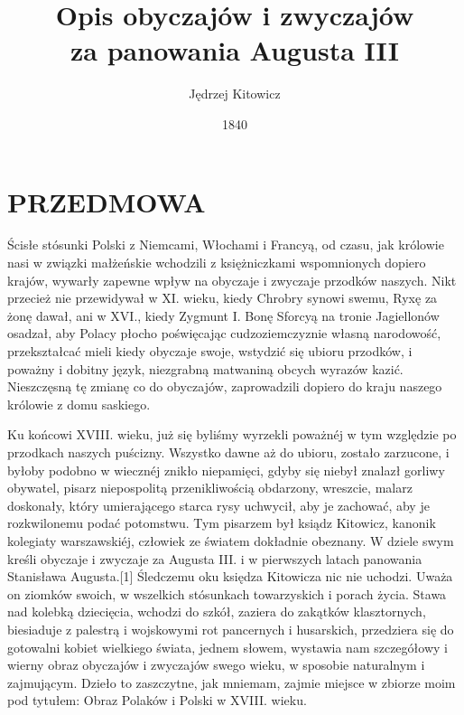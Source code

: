 \documentclass{book}
\begin{document}
\title{%
  \LARGE Opis obyczajów i zwyczajów \\
  \large za panowania Augusta III
  } 
\author{\Large Jędrzej Kitowicz}
\date{1840}

\maketitle

\pagebreak

\tableofcontents

\listoftables   

\chapter*{PRZEDMOWA}
Ścisłe stósunki Polski z Niemcami, Włochami i Francyą, od czasu, jak królowie nasi w związki małżeńskie wchodzili z księżniczkami wspomnionych dopiero krajów, wywarły zapewne wpływ na obyczaje i zwyczaje przodków naszych. Nikt przecież nie przewidywał w XI. wieku, kiedy Chrobry synowi swemu, Ryxę za żonę dawał, ani w XVI., kiedy Zygmunt I. Bonę Sforcyą na tronie Jagiellonów osadzał, aby Polacy płocho poświęcając cudzoziemczyznie własną narodowość, przekształcać mieli kiedy obyczaje swoje, wstydzić się ubioru przodków, i poważny i dobitny język, niezgrabną matwaniną obcych wyrazów kazić. Nieszczęsną tę zmianę co do obyczajów, zaprowadzili dopiero do kraju naszego królowie z domu saskiego.

Ku końcowi XVIII. wieku, już się byliśmy wyrzekli poważnéj w tym względzie po przodkach naszych puścizny. Wszystko dawne aż do ubioru, zostało zarzucone, i byłoby podobno w wiecznéj znikło niepamięci, gdyby się niebył znalazł gorliwy obywatel, pisarz niepospolitą przenikliwością obdarzony, wreszcie, malarz doskonały, który umierającego starca rysy uchwycił, aby je zachować, aby je rozkwilonemu podać potomstwu. Tym pisarzem był ksiądz Kitowicz, kanonik kolegiaty warszawskiéj, człowiek ze światem dokładnie obeznany. W dziele swym kreśli obyczaje i zwyczaje za Augusta III. i w pierwszych latach panowania Stanisława Augusta.[1] Śledczemu oku księdza Kitowicza nic nie uchodzi. Uważa on ziomków swoich, w wszelkich stósunkach towarzyskich i porach życia. Stawa nad kolebką dziecięcia, wchodzi do szkół, zaziera do zakątków klasztornych, biesiaduje z palestrą i wojskowymi rot pancernych i husarskich, przedziera się do gotowalni kobiet wielkiego świata, jednem słowem, wystawia nam szczegółowy i wierny obraz obyczajów i zwyczajów swego wieku, w sposobie naturalnym i zajmującym. Dzieło to zaszczytne, jak mniemam, zajmie miejsce w zbiorze moim pod tytułem: Obraz Polaków i Polski w XVIII. wieku.
\end{document}
